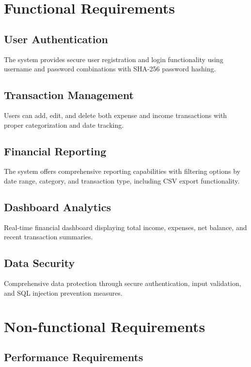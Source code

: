 \section{Functional Requirements}

\subsection{User Authentication}

The system provides secure user registration and login functionality using username and password combinations with SHA-256 password hashing.

\subsection{Transaction Management}

Users can add, edit, and delete both expense and income transactions with proper categorization and date tracking.

\subsection{Financial Reporting}

The system offers comprehensive reporting capabilities with filtering options by date range, category, and transaction type, including CSV export functionality.

\subsection{Dashboard Analytics}

Real-time financial dashboard displaying total income, expenses, net balance, and recent transaction summaries.

\subsection{Data Security}

Comprehensive data protection through secure authentication, input validation, and SQL injection prevention measures.

\section{Non-functional Requirements}

\subsection{Performance Requirements}

